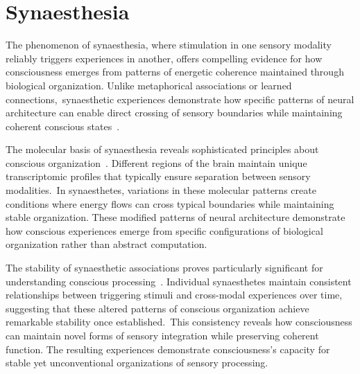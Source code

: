 \section{Synaesthesia}

The phenomenon of synaesthesia, where stimulation in one sensory modality reliably triggers experiences in another, offers compelling evidence for how consciousness emerges from patterns of energetic coherence maintained through biological organization. Unlike metaphorical associations or learned connections,~synaesthetic experiences demonstrate how specific patterns of neural architecture can enable direct crossing of sensory boundaries while maintaining coherent conscious states~\cite{Ramachandran2001, pinotsis2023cytoelectric}.

The molecular basis of synaesthesia reveals sophisticated principles about conscious organization~\cite{Hubbard2005, kukushkin2024massed}. Different regions of the brain maintain unique transcriptomic profiles that typically ensure separation between sensory modalities.~In synaesthetes, variations in these molecular patterns create conditions where energy flows can cross typical boundaries while maintaining stable organization. These modified patterns of neural architecture demonstrate how conscious experiences emerge from specific configurations of biological organization rather than abstract computation.

The stability of synaesthetic associations proves particularly significant for understanding conscious processing~\cite{Dixon2004, van2025processes}. Individual synaesthetes maintain consistent relationships between triggering stimuli and cross-modal experiences over time, suggesting that these altered patterns of conscious organization achieve remarkable stability once established.~This consistency reveals how consciousness can maintain novel forms of sensory integration while preserving coherent function. The resulting experiences demonstrate consciousness's capacity for stable yet unconventional organizations of sensory processing.

